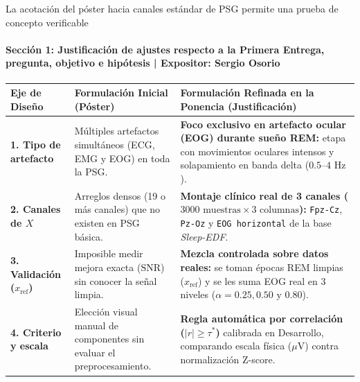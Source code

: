 \documentclass[aspectratio=169,9pt]{beamer}
\begin{document}
\begin{frame}{La acotaci\'on del p\'oster hacia canales est\'andar de PSG permite una prueba de concepto verificable}
  \framesubtitle{Secci\'on 1: Justificaci\'on de ajustes respecto a la Primera Entrega, pregunta, objetivo e hip\'otesis | Expositor: Sergio Osorio}

  \begin{tcolorbox}[basecard, title={\scriptsize\bfseries Evoluci\'on Metodol\'ogica Justificada: Del P\'oster (Entrega 1) a la Ponencia (Entrega 2)}, colbacktitle=UDNavy, coltitle=white]
    \scriptsize
    \renewcommand{\arraystretch}{1.12}
    \begin{tabularx}{\linewidth}{@{}p{2.5cm} p{4.2cm} Y@{}}
      \toprule
      \textbf{Eje de Dise\~no} & \textbf{Formulaci\'on Inicial (P\'oster)} & \textbf{Formulaci\'on Refinada en la Ponencia (Justificaci\'on)} \\
      \midrule
      \textbf{1. Tipo de artefacto} & M\'ultiples artefactos simult\'aneos (ECG, EMG y EOG) en toda la PSG. & \textbf{Foco exclusivo en artefacto ocular (EOG) durante sue\~no REM:} etapa con movimientos oculares intensos y solapamiento en banda delta ($0.5\text{--}4\text{ Hz}$). \\
      \textbf{2. Canales de $X$} & Arreglos densos (19 o m\'as canales) que no existen en PSG b\'asica. & \textbf{Montaje cl\'inico real de 3 canales ($3000\text{ muestras}\times 3\text{ columnas}$):} \texttt{Fpz-Cz}, \texttt{Pz-Oz} y \texttt{EOG horizontal} de la base \textit{Sleep-EDF}. \\
      \textbf{3. Validaci\'on ($x_{\text{ref}}$)} & Imposible medir mejora exacta ($\text{SNR}$) sin conocer la se\~nal limpia. & \textbf{Mezcla controlada sobre datos reales:} se toman \'epocas REM limpias ($x_{\text{ref}}$) y se les suma EOG real en 3 niveles ($\alpha = 0.25, 0.50\text{ y }0.80$). \\
      \textbf{4. Criterio y escala} & Elecci\'on visual manual de componentes sin evaluar el preprocesamiento. & \textbf{Regla autom\'atica por correlaci\'on ($|r| \ge \tau^*$)} calibrada en Desarrollo, comparando escala f\'isica ($\mu\text{V}$) contra normalizaci\'on Z-score. \\
      \bottomrule
    \end{tabularx}
  \end{tcolorbox}


\end{frame}
\end{document}
